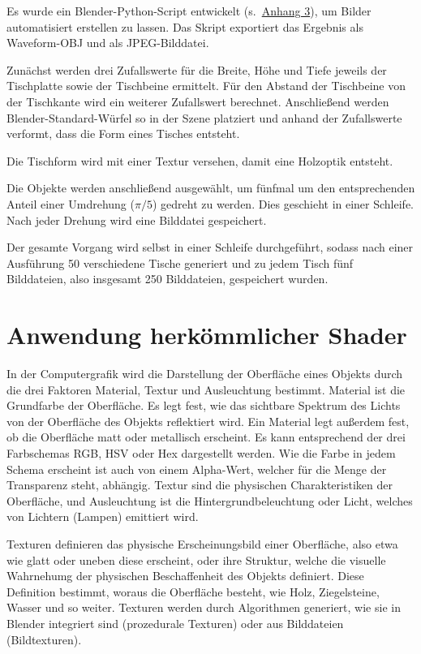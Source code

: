 Es wurde ein Blender-Python-Script entwickelt (s.~\hyperref[blenderpy]{Anhang 3}), um Bilder automatisiert erstellen zu lassen. Das Skript exportiert das Ergebnis als Waveform-OBJ und als JPEG-Bilddatei.

Zunächst werden drei Zufallswerte für die Breite, Höhe und Tiefe jeweils der Tischplatte sowie der Tischbeine ermittelt. Für den Abstand der Tischbeine von der Tischkante wird ein weiterer Zufallswert berechnet. Anschließend werden Blender-Standard-Würfel so in der Szene platziert und anhand der Zufallswerte verformt, dass die Form eines Tisches entsteht.

Die Tischform wird mit einer Textur versehen, damit eine Holzoptik entsteht.

Die Objekte werden anschließend ausgewählt, um fünfmal um den entsprechenden Anteil einer Umdrehung ($\pi/5$) gedreht zu werden. Dies geschieht in einer Schleife. Nach jeder Drehung wird eine Bilddatei gespeichert.

Der gesamte Vorgang wird selbst in einer Schleife durchgeführt, sodass nach einer Ausführung 50 verschiedene Tische generiert und zu jedem Tisch fünf Bilddateien, also insgesamt 250 Bilddateien, gespeichert wurden.


\section{Anwendung herkömmlicher Shader}
\label{sec:shader}
In der Computergrafik wird die Darstellung der Oberfläche eines Objekts durch die drei Faktoren Material, Textur und Ausleuchtung bestimmt. Material ist die Grundfarbe der Oberfläche. Es legt fest, wie das sichtbare Spektrum des Lichts von der Oberfläche des Objekts reflektiert wird. Ein Material legt außerdem fest, ob die Oberfläche matt oder metallisch erscheint. Es kann entsprechend der drei Farbschemas RGB, HSV oder Hex dargestellt werden. Wie die Farbe in jedem Schema erscheint ist auch von einem Alpha-Wert, welcher für die Menge der Transparenz steht, abhängig. Textur sind die physischen Charakteristiken der Oberfläche, und Ausleuchtung ist die Hintergrundbeleuchtung oder Licht, welches von Lichtern (Lampen) emittiert wird. \cite{blain2020blender}

Texturen definieren das physische Erscheinungsbild einer Oberfläche, also etwa wie glatt oder uneben diese erscheint, oder ihre Struktur, welche die visuelle Wahrnehumg der physischen Beschaffenheit des Objekts definiert. Diese Definition bestimmt, woraus die Oberfläche besteht, wie Holz, Ziegelsteine, Wasser und so weiter. Texturen werden durch Algorithmen generiert, wie sie in Blender integriert sind (prozedurale Texturen) oder aus Bilddateien (Bildtexturen). \cite{blain2020blender}

